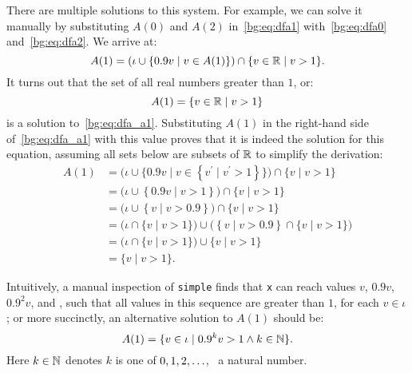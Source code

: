 There are multiple solutions to this system.  For example, we can solve
it manually by substituting $A(0)$ and $A(2)$ in~\eqref{bg:eq:dfa1}
with~\eqref{bg:eq:dfa0} and~\eqref{bg:eq:dfa2}.  We arrive at:
\begin{equation}
    A(1) = \left(
        \iota \cup \left\{ 0.9 v \mid v \in A(1) \right\}
    \right) \cap \{ v \in \mathbb{R} \mid v > 1 \}.
    \label{bg:eq:dfa_a1}
\end{equation}
It turns out that the set of all real numbers greater than $1$, or:
\begin{equation}
    A(1) = \{ v \in \mathbb{R} \mid v > 1 \}
    \label{bg:eq:a11}
\end{equation}
is a solution to~\eqref{bg:eq:dfa_a1}.  Substituting $A(1)$ in the right-hand
side of~\eqref{bg:eq:dfa_a1} with this value proves that it is indeed the
solution for this equation, assuming all sets below are subsets of $\mathbb{R}$
to simplify the derivation:
\begin{equation}
    \begin{aligned}
        A(1)
        &= \bigg( \iota \cup \Big\{ 0.9 v \mid v \in
                \left\{ v^\prime \mid v^\prime > 1 \right\}
           \Big\} \bigg) \cap \{ v \mid v > 1 \} \\
        &= \bigg( \iota \cup \left\{ 0.9 v \mid v > 1 \right\} \bigg) \cap
           \{ v \mid v > 1 \} \\
        &= \bigg( \iota \cup \left\{ v \mid v > 0.9 \right\} \bigg) \cap
           \{ v \mid v > 1 \} \\
        &= \bigg( \iota \cap \{ v \mid v > 1 \} \bigg) \cup
           \bigg(
               \left\{ v \mid v > 0.9 \right\} \cap \{ v  \mid v > 1 \}
           \bigg) \\
        &= \bigg( \iota \cap \{ v \mid v > 1 \} \bigg) \cup
           \{ v \mid v > 1 \} \\
        &= \{ v \mid v > 1 \}.
    \end{aligned}
\end{equation}

Intuitively, a manual inspection of \verb|simple| finds that \verb|x| can reach
values $v$, $0.9 v$, $0.9^2 v$, and \textellipsis, such that all values in this
sequence are greater than $1$, for each $v \in \iota$; or more succinctly, an
alternative solution to $A(1)$ should be:
\begin{equation}
    A(1) = \{ v \in \iota \mid 0.9^k v > 1 \wedge k \in \mathbb{N} \}.
    \label{bg:eq:a12}
\end{equation}
Here $k \in \mathbb{N}$ denotes $k$ is one of $0, 1, 2, \mathellipsis$, \ie~a
natural number.

